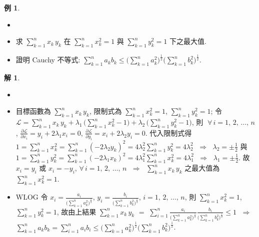 \documentclass[12pt]{extarticle}
\newcommand{\ds}{\displaystyle}
\newcommand{\ie}{\;\Longrightarrow\;}
\theoremstyle{definition}
\newtheorem*{ex}{例}
\newtheorem*{sol}{解}
\begin{document}
\begin{ex}
  \begin{itemize}\setlength{\itemsep}{0pt}
    \item[]
    \item 求 $\ds\sum_{k = 1}^n x_k\,y_k$ 在 $\ds\sum_{k = 1}^n x_k^2 = 1$ 與 $\ds\sum_{k = 1}^n y_k^2 = 1$ 下之最大值.
    \item 證明 Cauchy 不等式: $\ds\sum_{k = 1}^n a_k b_k \leqslant \Big(\sum_{k = 1}^n a_k^2\Big)^{\frac{1}{2}}\Big(\sum_{k = 1}^n b_k^2\Big)^{\frac{1}{2}}$.
  \end{itemize}
\end{ex}

\begin{sol}
  \begin{itemize}\setlength{\itemsep}{0pt}
    \item[]
    \item 目標函數為 $\ds\sum_{k = 1}^n x_k\,y_k$, 限制式為 $\ds\sum_{k = 1}^n x_k^2 = 1$, $\ds\sum_{k = 1}^n y_k^2 = 1$; 令 $\ds\mathcal{L} = \ds\sum_{k = 1}^n x_k\,y_k + \lambda_1\,\Big(\sum_{k = 1}^n x_k^2 - 1\Big) + \lambda_2\,\Big(\sum_{k = 1}^n y_k^2 - 1\Big)$, 則 $\;\forall\,i = 1,\,2,\,\ldots,\,n$, $\ds\frac{\partial\mathcal{L}}{\partial x_i} = y_i + 2\lambda_1 x_i = 0$, $\ds\frac{\partial\mathcal{L}}{\partial y_i} = x_i + 2\lambda_2 y_i = 0$. 代入限制式得 $\ds 1 = \sum_{k = 1}^n x_k^2 = \sum_{k = 1}^n(-2\lambda_2 y_k)^2 = 4\lambda_2^2\sum_{k = 1}^n y_k^2 = 4\lambda_2^2$ $\ie$ $\ds\lambda_2 = \pm\frac{1}{2}$ 與 $\ds 1 = \sum_{k = 1}^n y_k^2 = \sum_{k = 1}^n(-2\lambda_1 x_k)^2 = 4\lambda_1^2\sum_{k = 1}^n x_k^2 = 4\lambda_1^2$ $\ie$ $\ds\lambda_1 = \pm\frac{1}{2}$. 故 $x_i = y_i$ 或 $x_i = -y_i$, $\forall\,i = 1,\,2,\,\ldots,\,n$ $\ie$ $\ds\sum_{k = 1}^n x_k\,y_k$ 之最大值為 $\ds\sum_{k = 1}^n x_k^2 = 1$.  
    \item WLOG 令 $\ds x_i = \frac{a_i}{\big(\sum_{k = 1}^n a_k^2\big)^{\frac{1}{2}}}$, $\ds y_i = \frac{b_i}{\big(\sum_{k = 1}^n b_k^2\big)^{\frac{1}{2}}}$, $i = 1,\,2,\,\ldots,\,n$, 則 $\ds\sum_{k = 1}^n x_k^2 = 1$, $\ds\sum_{k = 1}^n y_k^2 = 1$, 故由上結果 $\ds\sum_{k = 1}^n x_k\,y_k$ $=$ $\ds\sum_{i = 1}^n \frac{a_i}{\big(\sum_{k = 1}^n a_k^2\big)^{\frac{1}{2}}}\frac{b_i}{\big(\sum_{k = 1}^n b_k^2\big)^{\frac{1}{2}}}\leqslant 1$ $\ie$ $\ds\sum_{k = 1}^n a_k b_k = \sum_{i = 1}^n a_i b_i \leqslant \Big(\sum_{k = 1}^n a_k^2\Big)^{\frac{1}{2}}\Big(\sum_{k = 1}^n b_k^2\Big)^{\frac{1}{2}}$.   
  \end{itemize}
\end{sol}
\end{document}
